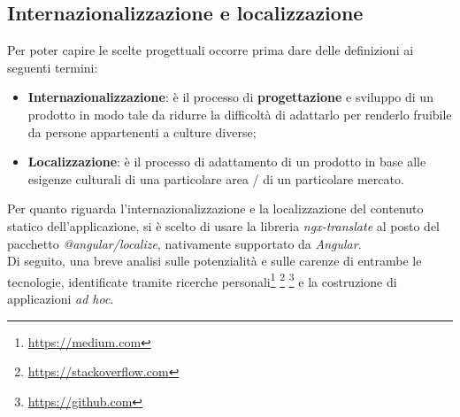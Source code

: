 \subsection{Internazionalizzazione e localizzazione}
Per poter capire le scelte progettuali occorre prima dare delle definizioni ai seguenti termini:
\begin{itemize}
    \item \textbf{Internazionalizzazione}: è il processo di \textbf{progettazione} e sviluppo di un prodotto in modo tale da ridurre la difficoltà di adattarlo per renderlo fruibile da persone appartenenti a culture diverse;
    \item \textbf{Localizzazione}: è il processo di adattamento di un prodotto in base alle esigenze culturali di una particolare area / di un particolare mercato.
\end{itemize}
Per quanto riguarda l’internazionalizzazione e la localizzazione del contenuto statico dell’applicazione, si è scelto di usare la libreria \textit{ngx-translate} al posto del pacchetto \textit{@angular/localize}, nativamente supportato da \textit{Angular}. \\
Di seguito, una breve analisi sulle potenzialità e sulle carenze di entrambe le tecnologie, identificate tramite ricerche personali\footnote{\href{https://medium.com/holisticon-consultants/angular-i18n-picking-the-right-tool-for-the-job-b543460801db}{https://medium.com}} \footnote{\href{https://stackoverflow.com/questions/44923138/differences-ngx-translate-vs-i18n}{https://stackoverflow.com}}
\footnote{\href{https://github.com/ngx-translate/core/issues/495}{https://github.com}} e la costruzione di applicazioni \textit{ad hoc}.

